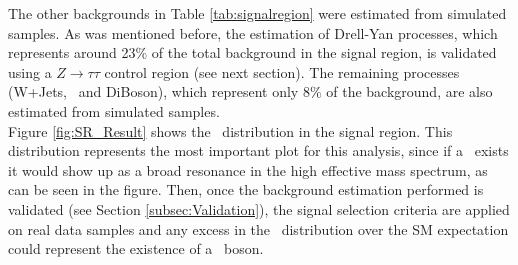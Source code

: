 \noindent The other backgrounds in Table \ref{tab:signalregion} were estimated from 
simulated samples. As was mentioned before, the estimation of Drell-Yan processes, 
which represents around 23$\%$ of the total background in the signal region,
is validated using a $Z \rightarrow \tau\tau$ control region (see next section). 
The remaining processes (W+Jets, \ttbar~and DiBoson), which represent only  
8$\%$ of the background, are also estimated from simulated samples. \\

\noindent Figure \ref{fig:SR_Result} shows the \mass~distribution in the 
signal region. This distribution represents the most important plot for this analysis, since if a 
\Zprime~exists it would show up as a broad resonance in the high effective 
mass spectrum, as can be seen in the figure. Then, once the 
background estimation performed is validated (see Section \ref{subsec:Validation}), 
the signal selection criteria are applied on real data samples and
any excess in the \mass~distribution over the SM expectation 
could represent the existence of a \Zprime~boson. 

